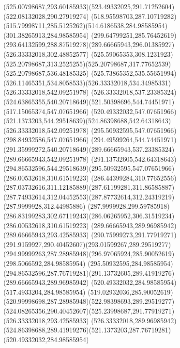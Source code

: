 {{\curveto(525.00798687,293.60185933)(523.49332025,291.71252604)(522.08132028,290.27919274)
\curveto(518.95598703,287.10719282)(515.79998711,285.5125262)(514.6186538,284.98585954)
\lineto(301.38265913,284.98585954)
\curveto(299.64799251,285.76452619)(293.64132599,288.87519278)(289.66665943,296.01385927)
\closepath
\moveto(526.33332018,302.48852577)
\curveto(525.59065353,308.1231923)(525.20798687,313.2525255)(525.20798687,317.77652539)
\lineto(525.20798687,536.48185325)
\curveto(525.73865352,535.55651994)(526.11465351,534.8058533)(526.33332018,534.34985331)
\closepath
\moveto(526.33332018,542.09251978)
\lineto(526.33332018,537.23385324)
\curveto(524.63865355,540.20718649)(521.50398696,544.74451971)(517.15065374,547.07651966)
\lineto(520.49332032,547.07651966)
\curveto(521.1373203,544.29518639)(524.86398688,542.64318643)(526.33332018,542.09251978)
\moveto(295.50932595,547.07651966)
\lineto(298.84932586,547.07651966)
\curveto(294.49599264,544.74451971)(291.35999272,540.20718649)(289.66665943,537.23385324)
\lineto(289.66665943,542.09251978)
\curveto(291.13732605,542.64318643)(294.86532596,544.29518639)(295.50932595,547.07651966)
\moveto(286.00532618,310.61519223)
\curveto(286.44399284,310.77652556)(287.03732616,311.12185889)(287.61199281,311.86585887)
\curveto(287.74932614,312.04452553)(287.87732614,312.24319219)(287.9999928,312.44985886)
\lineto(287.9999928,299.59785918)
\curveto(286.83199283,302.67119243)(286.06265952,306.31519234)(286.00532618,310.61519223)
\moveto(289.66665943,289.96985942)
\lineto(289.66665943,293.42585933)
\curveto(290.75999273,291.77919271)(291.9159927,290.40452607)(293.01599267,289.29519277)
\curveto(294.99999263,287.28985948)(296.97065924,285.90052619)(298.5066592,284.98585954)
\lineto(295.50932595,284.98585954)
\curveto(294.86532596,287.76719281)(291.13732605,289.41919276)(289.66665943,289.96985942)
\moveto(520.49332032,284.98585954)
\lineto(517.4933204,284.98585954)
\curveto(519.02932036,285.90052619)(520.99998698,287.28985948)(522.98398693,289.29519277)
\curveto(524.08265356,290.40452607)(525.23998687,291.77919271)(526.33332018,293.42585933)
\lineto(526.33332018,289.96985942)
\curveto(524.86398688,289.41919276)(521.1373203,287.76719281)(520.49332032,284.98585954)
}
}

